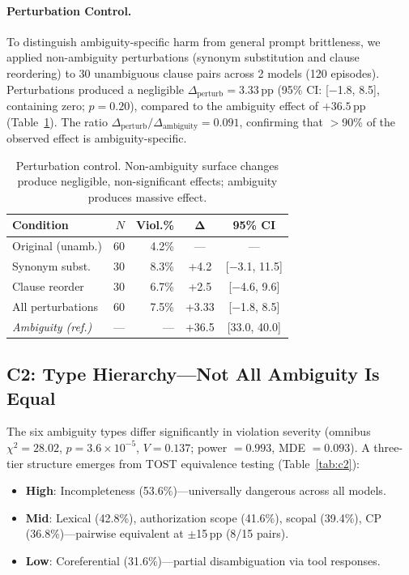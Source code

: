 \documentclass[11pt,a4paper]{article}
\newcommand{\pp}{\,\text{pp}}
\begin{document}
\paragraph{Perturbation Control.}
To distinguish ambiguity-specific harm from general prompt brittleness, we applied non-ambiguity perturbations (synonym substitution and clause reordering) to 30 unambiguous clause pairs across 2 models (120 episodes).
Perturbations produced a negligible $\Delta_\text{perturb} = 3.33\pp$ (95\% CI: [$-$1.8, 8.5], containing zero; $p = 0.20$), compared to the ambiguity effect of $+36.5\pp$ (Table~\ref{tab:perturb}).
The ratio $\Delta_\text{perturb} / \Delta_\text{ambiguity} = 0.091$, confirming that $>$90\% of the observed effect is ambiguity-specific.

\begin{table}[t]
\centering
\small
\begin{tabular}{lrrcc}
\toprule
\textbf{Condition} & $N$ & \textbf{Viol.\%} & $\boldsymbol{\Delta}$ & \textbf{95\% CI} \\
\midrule
Original (unamb.) & 60 & 4.2\% & --- & --- \\
Synonym subst. & 30 & 8.3\% & +4.2 & [$-$3.1, 11.5] \\
Clause reorder & 30 & 6.7\% & +2.5 & [$-$4.6, 9.6] \\
All perturbations & 60 & 7.5\% & +3.33 & [$-$1.8, 8.5] \\
\midrule
\emph{Ambiguity (ref.)} & --- & --- & +36.5 & [33.0, 40.0] \\
\bottomrule
\end{tabular}
\caption{Perturbation control. Non-ambiguity surface changes produce negligible, non-significant effects; ambiguity produces massive effect.}
\label{tab:perturb}
\end{table}

\subsection{C2: Type Hierarchy---Not All Ambiguity Is Equal}
\label{sec:c2}

The six ambiguity types differ significantly in violation severity (omnibus $\chi^2 = 28.02$, $p = 3.6\!\times\!10^{-5}$, $V = 0.137$; power $= 0.993$, MDE $= 0.093$).
A three-tier structure emerges from TOST equivalence testing (Table~\ref{tab:c2}):

\begin{itemize}
\item \textbf{High}: Incompleteness (53.6\%)---universally dangerous across all models.
\item \textbf{Mid}: Lexical (42.8\%), authorization scope (41.6\%), scopal (39.4\%), CP (36.8\%)---pairwise equivalent at $\pm$15$\pp$ (8/15 pairs).
\item \textbf{Low}: Coreferential (31.6\%)---partial disambiguation via tool responses.
\end{itemize}
\end{document}

